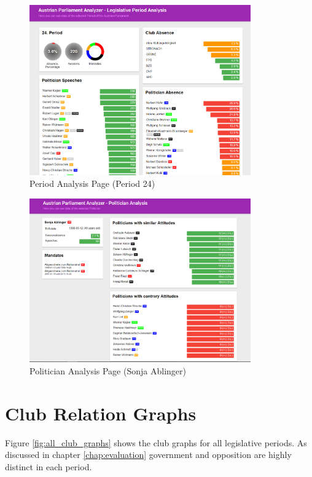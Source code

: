 \begin{figure}[h!]
	\center
	\includegraphics[width=0.85\textwidth]{imgs/screenshot_period}
	\caption{Period Analysis Page (Period 24)}
	\label{fig:screenshot_period}
\end{figure}

\begin{figure}[h!]
	\center
	\includegraphics[width=0.85\textwidth]{imgs/screenshot_politician}
	\caption{Politician Analysis Page (Sonja Ablinger)}
	\label{fig:screenshot_politician}
\end{figure}

\pagebreak
\pagebreak

\section{Club Relation Graphs}

Figure \ref{fig:all_club_graphs} shows the club graphs for all legislative periods. As discussed in chapter \ref{chap:evaluation} government and opposition are highly distinct in each period.

